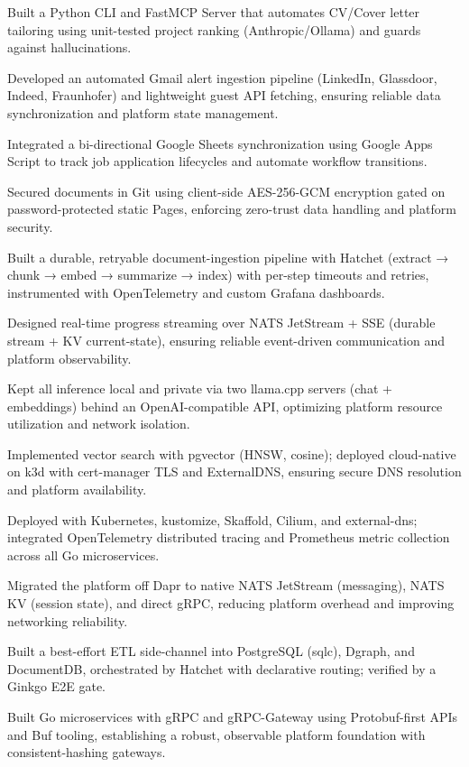 \documentclass[11pt,a4paper]{resume}
\begin{document}
\bullets
  \item Built a Python CLI and FastMCP Server that automates CV/Cover letter tailoring using unit-tested project ranking (Anthropic/Ollama) and guards against hallucinations.
  \item Developed an automated Gmail alert ingestion pipeline (LinkedIn, Glassdoor, Indeed, Fraunhofer) and lightweight guest API fetching, ensuring reliable data synchronization and platform state management.
  \item Integrated a bi-directional Google Sheets synchronization using Google Apps Script to track job application lifecycles and automate workflow transitions.
  \item Secured documents in Git using client-side AES-256-GCM encryption gated on password-protected static Pages, enforcing zero-trust data handling and platform security.
\bulletsend
\vspace{2pt}
\bullets
  \item Built a durable, retryable document-ingestion pipeline with Hatchet (extract → chunk → embed → summarize → index) with per-step timeouts and retries, instrumented with OpenTelemetry and custom Grafana dashboards.
  \item Designed real-time progress streaming over NATS JetStream + SSE (durable stream + KV current-state), ensuring reliable event-driven communication and platform observability.
  \item Kept all inference local and private via two llama.cpp servers (chat + embeddings) behind an OpenAI-compatible API, optimizing platform resource utilization and network isolation.
  \item Implemented vector search with pgvector (HNSW, cosine); deployed cloud-native on k3d with cert-manager TLS and ExternalDNS, ensuring secure DNS resolution and platform availability.
\bulletsend
\vspace{2pt}
\bullets
  \item Deployed with Kubernetes, kustomize, Skaffold, Cilium, and external-dns; integrated OpenTelemetry distributed tracing and Prometheus metric collection across all Go microservices.
  \item Migrated the platform off Dapr to native NATS JetStream (messaging), NATS KV (session state), and direct gRPC, reducing platform overhead and improving networking reliability.
  \item Built a best-effort ETL side-channel into PostgreSQL (sqlc), Dgraph, and DocumentDB, orchestrated by Hatchet with declarative routing; verified by a Ginkgo E2E gate.
  \item Built Go microservices with gRPC and gRPC-Gateway using Protobuf-first APIs and Buf tooling, establishing a robust, observable platform foundation with consistent-hashing gateways.
\bulletsend
\end{document}

